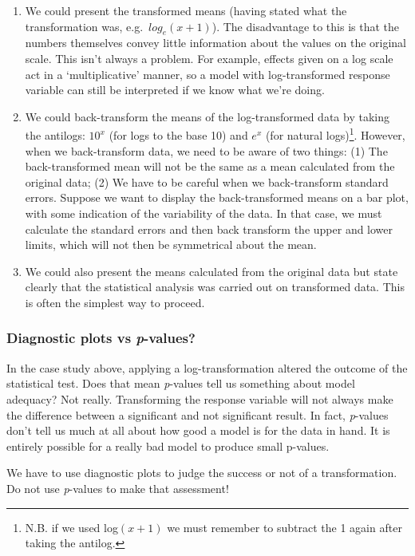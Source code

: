 \documentclass[
]{book}
\newenvironment{greybox}{
  \definecolor{shadecolor}{rgb}{0.95,0.95,0.95}  %
  \color{black}
  \begin{shaded}}
 {\end{shaded}}
\newenvironment{infobox}[1]
  {
  \begin{itemize}
  \renewcommand{\labelitemi}{
    \raisebox{-.7\height}[0pt][0pt]{
      {\setkeys{Gin}{width=3em,keepaspectratio}
        \texttt{[image: images/\#1]}}
    }
  }
  \setlength{\fboxsep}{1em}
  \begin{greybox}
  \item
  }
  {
  \end{greybox}
  \end{itemize}
  }
\begin{document}
\begin{enumerate}
\def\labelenumi{\arabic{enumi}.}
\item
  We could present the transformed means (having stated what the transformation was, e.g.~\(log_{e}(x+1)\)). The disadvantage to this is that the numbers themselves convey little information about the values on the original scale. This isn't always a problem. For example, effects given on a log scale act in a `multiplicative' manner, so a model with log-transformed response variable can still be interpreted if we know what we're doing.
\item
  We could back-transform the means of the log-transformed data by taking the antilogs: \(10^{x}\) (for logs to the base 10) and \(e^{x}\) (for natural logs)\footnote{N.B. if we used log\((x+1)\) we must remember to subtract the 1 again after taking the antilog.}. However, when we back-transform data, we need to be aware of two things: (1) The back-transformed mean will not be the same as a mean calculated from the original data; (2) We have to be careful when we back-transform standard errors. Suppose we want to display the back-transformed means on a bar plot, with some indication of the variability of the data. In that case, we must calculate the standard errors and then back transform the upper and lower limits, which will not then be symmetrical about the mean.
\item
  We could also present the means calculated from the original data but state clearly that the statistical analysis was carried out on transformed data. This is often the simplest way to proceed.
\end{enumerate}

\begin{infobox}{warning}

\hypertarget{diagnostic-plots-vs-p-values}{%
\subsubsection*{\texorpdfstring{Diagnostic plots vs \emph{p}-values?}{Diagnostic plots vs p-values?}}\label{diagnostic-plots-vs-p-values}}

In the case study above, applying a log-transformation altered the outcome of the statistical test. Does that mean \emph{p}-values tell us something about model adequacy? Not really. Transforming the response variable will not always make the difference between a significant and not significant result. In fact, \emph{p}-values don't tell us much at all about how good a model is for the data in hand. It is entirely possible for a really bad model to produce small p-values.

We have to use diagnostic plots to judge the success or not of a transformation. Do not use \emph{p}-values to make that assessment!

\end{infobox}
\end{document}
